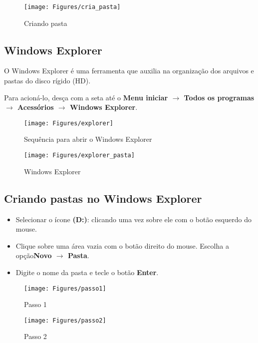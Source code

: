 \documentclass[hidelinks,12pt]{article}
\begin{document}
	\begin{figure}[!h]
		\centering
		\texttt{[image: Figures/cria\_pasta]}
		\caption{Criando pasta}
		\label{fig:criando pasta}
	\end{figure}

\subsection{Windows Explorer}

O Windows Explorer é uma ferramenta que auxilia na organização dos arquivos e pastas do disco rígido (HD).


Para acioná-lo, desça com a seta até o {\bf Menu iniciar $\rightarrow$ Todos os programas $\rightarrow$ Acessórios $\rightarrow$ Windows Explorer}.


\begin{figure}[!h]
	\centering
	\texttt{[image: Figures/explorer]}
	\caption{Sequência para abrir o Windows Explorer}
	\label{fig:explorer}
\end{figure}


\begin{figure}[!h]
	\centering
	\texttt{[image: Figures/explorer\_pasta]}
	\caption{Windows Explorer}
	\label{fig:explorer_p}
\end{figure}

\newpage
\subsection{Criando pastas no Windows Explorer}

\begin{itemize}

	\item Selecionar o ícone {\bf(D:)}: clicando uma vez sobre ele com o botão esquerdo do mouse.
	\item Clique sobre uma área vazia com o botão direito do mouse. Escolha a opção{\bf Novo $\rightarrow$ Pasta}.

	\item Digite o nome da pasta e tecle o botão {\bf Enter}.
\end{itemize}

\begin{figure}[!h]
	\centering
	\texttt{[image: Figures/passo1]}
	\caption{Passo 1}
	\label{fig:passo1}
\end{figure}


\begin{figure}[!h]
	\centering
	\texttt{[image: Figures/passo2]}
	\caption{Passo 2}
	\label{fig:passo2}
\end{figure}
\end{document}
